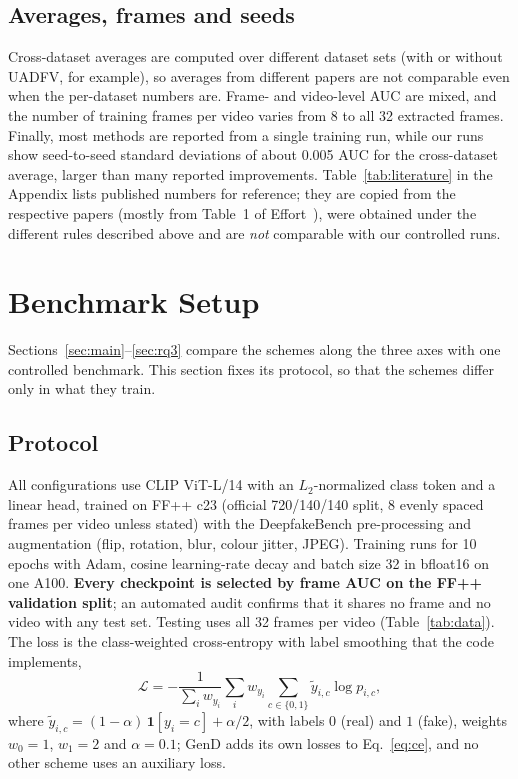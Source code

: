 \documentclass[fonts]{icst}
\begin{document}
\subsection{Averages, frames and seeds}
Cross-dataset averages are computed over different dataset sets (with or without UADFV, for example), so averages from different papers are not comparable even when the per-dataset numbers are. Frame- and video-level AUC are mixed, and the number of training frames per video varies from 8 to all 32 extracted frames. Finally, most methods are reported from a single training run, while our runs show seed-to-seed standard deviations of about 0.005 AUC for the cross-dataset average, larger than many reported improvements. Table~\ref{tab:literature} in the Appendix lists published numbers for reference; they are copied from the respective papers (mostly from Table~1 of Effort~\cite{yan2025effort}), were obtained under the different rules described above and are \emph{not} comparable with our controlled runs.



\section{Benchmark Setup}
\label{sec:bench}
Sections~\ref{sec:main}--\ref{sec:rq3} compare the schemes along the three axes with one controlled benchmark. This section fixes its protocol, so that the schemes differ only in what they train.

\subsection{Protocol}
\label{sec:protocol}
All configurations use CLIP ViT-L/14 with an $L_2$-normalized class token and a linear head, trained on FF++ c23 (official 720/140/140 split, 8 evenly spaced frames per video unless stated) with the DeepfakeBench pre-processing and augmentation (flip, rotation, blur, colour jitter, JPEG). Training runs for 10 epochs with Adam, cosine learning-rate decay and batch size 32 in bfloat16 on one A100. \textbf{Every checkpoint is selected by frame AUC on the FF++ validation split}; an automated audit confirms that it shares no frame and no video with any test set. Testing uses all 32 frames per video (Table~\ref{tab:data}). The loss is the class-weighted cross-entropy with label smoothing that the code implements,
\begin{equation}
\mathcal{L}=-\frac{1}{\sum_i w_{y_i}}\sum_{i} w_{y_i}\sum_{c\in\{0,1\}}\tilde{y}_{i,c}\log p_{i,c},
\label{eq:ce}
\end{equation}
where $\tilde{y}_{i,c}=(1-\alpha)\,\mathbf{1}[y_i=c]+\alpha/2$, with labels $0$ (real) and $1$ (fake), weights $w_0=1$, $w_1=2$ and $\alpha=0.1$; GenD adds its own losses to Eq.~\eqref{eq:ce}, and no other scheme uses an auxiliary loss.
\end{document}
